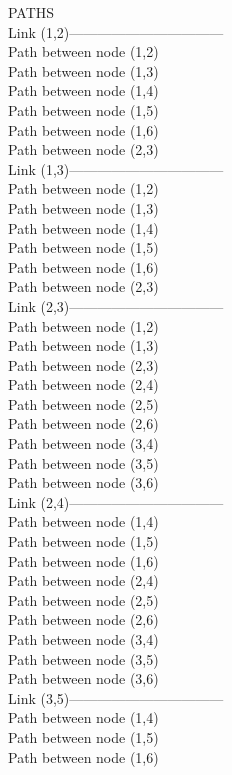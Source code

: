 PATHS\\
Link (1,2)---------------------------------\\
Path between node (1,2)\\
Path between node (1,3)\\
Path between node (1,4)\\
Path between node (1,5)\\
Path between node (1,6)\\
Path between node (2,3)\\
Link (1,3)---------------------------------\\
Path between node (1,2)\\
Path between node (1,3)\\
Path between node (1,4)\\
Path between node (1,5)\\
Path between node (1,6)\\
Path between node (2,3)\\
Link (2,3)---------------------------------\\
Path between node (1,2)\\
Path between node (1,3)\\
Path between node (2,3)\\
Path between node (2,4)\\
Path between node (2,5)\\
Path between node (2,6)\\
Path between node (3,4)\\
Path between node (3,5)\\
Path between node (3,6)\\
Link (2,4)---------------------------------\\
Path between node (1,4)\\
Path between node (1,5)\\
Path between node (1,6)\\
Path between node (2,4)\\
Path between node (2,5)\\
Path between node (2,6)\\
Path between node (3,4)\\
Path between node (3,5)\\
Path between node (3,6)\\
Link (3,5)---------------------------------\\
Path between node (1,4)\\
Path between node (1,5)\\
Path between node (1,6)\\
